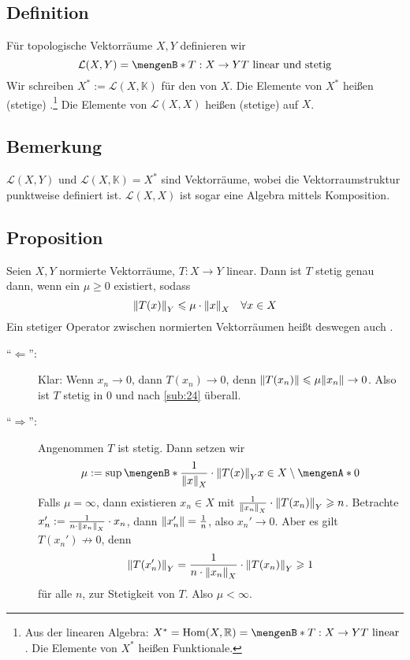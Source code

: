 \subsection[Definition: Stetige Funktionale und Operatoren]{Definition} %
\label{sub:25}
Für topologische Vektorräume $X,Y$ definieren wir 
\[
	\mathcal{L}(X,Y) = \set[T : X \to Y]{T \text{ linear und stetig}}  
\]
Wir schreiben $X^*:= \mathcal{L}(X,\mathds{K})$ für den  von $X$. Die Elemente von $X^*$ heißen (stetige) .\footnote{Aus der linearen Algebra: $X^* = \Hom(X,\mathds{R}) = \set[T : X \to Y]{T \text{ linear}}$. Die Elemente von $X^*$ heißen Funktionale.}
Die Elemente von $\mathcal{L}(X,X)$ heißen (stetige)  auf $X$. 

\subsection[Bemerkung: Vektorraumstruktur auf $\mathcal{L}(X,Y)$, Algebrastruktur auf $\mathcal{L}(X,X)$]{Bemerkung} %
\label{sub:26}
$\mathcal{L}(X,Y)$ und $\mathcal{L}(X,\mathds{K}) = X^*$ sind Vektorräume, wobei die Vektorraumstruktur punktweise definiert ist. $\mathcal{L}(X,X)$ ist sogar eine Algebra mittels Komposition.

\subsection[Proposition: Stetigkeit linearer Abbildungen mittels Normabschätzung]{Proposition} %
\label{sub:27}
Seien $X,Y$ normierte Vektorräume, $T : X \to Y$ linear. Dann ist $T$ stetig genau dann, wenn ein $\mu \ge 0$ existiert, sodass 
\[
	\norm[Y]{T(x)} \le \mu \cdot \norm[X]{x} \quad \forall x \in X  
\]
Ein stetiger Operator zwischen normierten Vektorräumen heißt deswegen auch .
\begin{description}
	\item[\enquote{$\Leftarrow$}:] Klar: Wenn $x_n \to 0$, dann $T(x_n) \to 0$, denn $\norm{T(x_n)} \le \mu \norm{x_n } \to 0$. Also ist $T$ stetig in $0$ und nach
	\ref{sub:24} überall.
	\item[\enquote{$\Rightarrow $}:] Angenommen $T$ ist stetig. Dann setzen wir
	\[
		\mu := \sup \set[{\frac{1}{\norm[X]{x}} \cdot \norm[Y]{T(x)}  }]{x \in X \setminus \set{0} } 
	\] 
	Falls $\mu = \infty$, dann existieren $x_n \in X$ mit $\frac{1}{\norm[X]{x_n}} \cdot \norm[Y]{T(x_n)} \ge n$. Betrachte 
	$x_n' :=  \frac{1}{n \cdot \norm[X]{x_n}} \cdot x_n $, dann $\norm{x_n'} = \frac{1}{n}$, also $x_n' \to 0$. Aber es gilt $T(x_n')\not\longrightarrow 0$, denn
	\begin{align*}
		\norm[Y]{T(x_n')} = \frac{1}{n \cdot \norm[X]{x_n} } \cdot \norm[Y]{T(x_n)} \ge 1 
	\end{align*}
	für alle $n$, \light zur Stetigkeit von $T$. Also $\mu < \infty$. \bewende 
\end{description}

